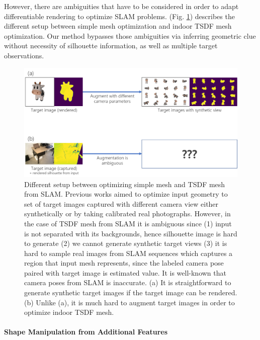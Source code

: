 However, there are ambiguities that have to be considered in order to adapt differentiable rendering to optimize SLAM problems. 
(Fig.  \ref{fig:difference_simple_mesh_and_tsdf_mesh}) describes the different setup between simple mesh optimization and indoor TSDF mesh optimization. 
Our method bypasses those ambiguities via inferring geometric clue without necessity of silhouette information, as well as multiple target observations.
\begin{figure}
    \includegraphics[width=\columnwidth]{figures/2_prev_difference_simple_mesh_and_tsdf_mesh.png}
    \caption{Different setup between optimizing simple mesh and TSDF mesh from SLAM. Previous works aimed to optimize input geometry to set of target images captured with different camera view either synthetically\cite{ravi2020accelerating}\cite{jatavallabhula2019kaolin}\cite{laine2020modular}\cite{nimier2019mitsuba} or by taking calibrated real photographs\cite{nimier2019mitsuba}. However, in the case of TSDF mesh from SLAM it is ambiguous since (1) input is not separated with its backgrounds, hence silhouette image is hard to generate (2) we cannot generate synthetic target views (3) it is hard to sample real images from SLAM sequences which captures a region that input mesh represents, since the labeled camera pose paired with target image is estimated value. It is well-known that camera poses from SLAM is inaccurate. (a) It is straightforward to generate synthetic target images if the target image can be rendered. (b) Unlike (a), it is much hard to augment target images in order to optimize indoor TSDF mesh.}
    \label{fig:difference_simple_mesh_and_tsdf_mesh}
\end{figure}

\paragraph{Shape Manipulation from Additional Features}

